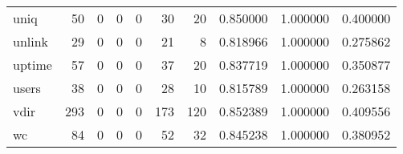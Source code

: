 \begin{longtable}{lrrrrrrrrr}
uniq      &                                        50 &                                                  0 &                                                  0 &                                                  0 &                                                 30 &                                                 20 &                                           0.850000 &                               1.000000 &                             0.400000 \\
unlink    &                                        29 &                                                  0 &                                                  0 &                                                  0 &                                                 21 &                                                  8 &                                           0.818966 &                               1.000000 &                             0.275862 \\
uptime    &                                        57 &                                                  0 &                                                  0 &                                                  0 &                                                 37 &                                                 20 &                                           0.837719 &                               1.000000 &                             0.350877 \\
users     &                                        38 &                                                  0 &                                                  0 &                                                  0 &                                                 28 &                                                 10 &                                           0.815789 &                               1.000000 &                             0.263158 \\
vdir      &                                       293 &                                                  0 &                                                  0 &                                                  0 &                                                173 &                                                120 &                                           0.852389 &                               1.000000 &                             0.409556 \\
wc        &                                        84 &                                                  0 &                                                  0 &                                                  0 &                                                 52 &                                                 32 &                                           0.845238 &                               1.000000 &                             0.380952 \\

\end{longtable}
